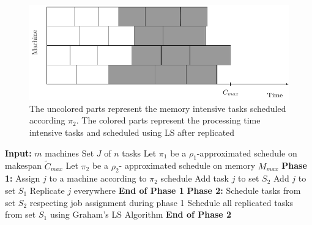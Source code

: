    \begin{figure}[htp]
   \centering
   \includegraphics[width= 16 cm]{mem.pdf}
   \caption{The uncolored parts represent the memory intensive tasks scheduled according $\pi_2$. The colored parts represent the processing time intensive tasks and scheduled using LS after replicated}
   \label{fig:memory}
   \end{figure}
  \begin{algorithm}
  
  \caption{$ABO_\triangle$}
  \label{alg1}
   \begin{algorithmic} 
   \State \textbf{Input:} $m$ machines 
   \State \hspace*{42pt}Set $J$ of $n$ tasks
   \State\hspace*{42pt}Let $\pi_1$ be a $ \rho_1$-approximated schedule on makespan $\tilde{C}_{max}$ 
  \State \hspace*{42pt}Let $\pi_2$ be a $\rho_2$- approximated schedule on memory ${M_{max}}$
  \State
   \State \textbf{Phase 1:}
\State Assign $j$ to a machine according to $\pi_2$ schedule
\State Add task $j$ to set $S_2$   
\EndIf 
\EndFor
{}
\State Add $j$ to set $S_1$
\State Replicate $j$ everywhere   
\EndIf 
\EndFor
 \State \textbf{End of Phase 1} 
 \State 
  \State \textbf{Phase 2:} 
  \State \hspace*{42pt}Schedule tasks from set $S_2$ respecting job assignment during phase 1
     \State \hspace*{42pt} Schedule all replicated tasks from set $S_1$ using Graham's LS Algorithm 
  \State \textbf{End of Phase 2} 
   
        \end{algorithmic}
        \end{algorithm}
      
